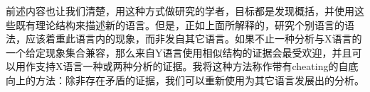 前述内容也让我们清楚，用这种方式做研究的学者，目标都是发现概括，并使用这些既有理论结构来描述新的语言。但是，正如上面所解释的，研究个别语言的语法，应该着重此语言内的现象，而非发自其它语言。如果不止一种分析与X语言的一个给定现象集合兼容，那么来自Y语言使用相似结构的证据会最受欢迎，并且可以用作支持X语言一种或两种分析的证据。我将这种方法称作带有cheating的自底向上的方法：除非存在矛盾的证据，我们可以重新使用为其它语言发展出的分析。

